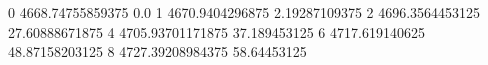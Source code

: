 0 4668.74755859375 0.0
1 4670.9404296875 2.19287109375
2 4696.3564453125 27.60888671875
4 4705.93701171875 37.189453125
6 4717.619140625 48.87158203125
8 4727.39208984375 58.64453125
